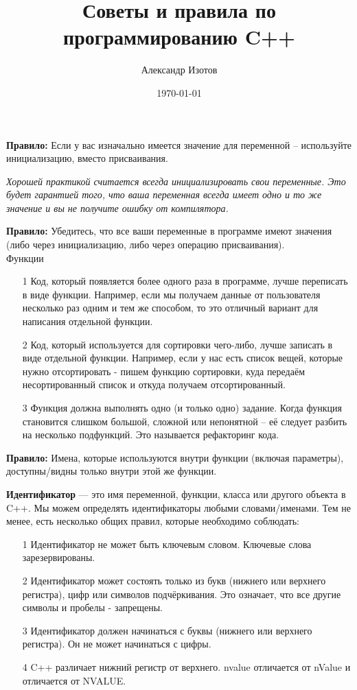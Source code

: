 \documentclass[a4paper,16pt]{report} %
\title{Советы и правила по программированию C++}
\date{\today} %
\author{Александр Изотов}
\begin{document}
\maketitle %


\textbf{Правило:} Если у вас изначально имеется значение для переменной – используйте инициализацию, вместо присваивания.

\textit{Хорошей практикой считается всегда инициализировать свои переменные. Это будет гарантией того, что ваша переменная всегда имеет одно и то же значение и вы не получите ошибку от компилятора.}

\textbf{Правило:} Убедитесь, что все ваши переменные в программе имеют значения (либо через инициализацию, либо через операцию присваивания).
\\

Функции

\begin{itemize}
	\item[1] Код, который появляется более одного раза в программе, лучше переписать в виде функции. Например, если мы получаем данные от пользователя несколько раз одним и тем же способом, то это отличный вариант для написания отдельной функции.
	\item[2] Код, который используется для сортировки чего-либо, лучше записать в виде отдельной функции. Например, если у нас есть список вещей, которые нужно отсортировать - пишем функцию сортировки, куда передаём несортированный список и откуда получаем отсортированный.
	\item[3] Функция должна выполнять одно (и только одно) задание.
	Когда функция становится слишком большой, сложной или непонятной – её следует разбить на несколько подфункций. Это называется рефакторинг кода.
\end{itemize}


\textbf{Правило:} Имена, которые используются внутри функции (включая
параметры), доступны/видны только внутри этой же функции.

\textbf{Идентификатор} — это имя переменной, функции, класса или другого объекта в C++. Мы можем определять идентификаторы любыми словами/именами. Тем не менее, есть несколько общих правил, которые необходимо соблюдать:
\begin{itemize}
\item[1]Идентификатор не может быть ключевым словом. Ключевые слова зарезервированы.
\item[2]Идентификатор может состоять только из букв (нижнего или верхнего регистра), цифр или символов подчёркивания. Это означает, что все другие символы и пробелы - запрещены.
\item[3]Идентификатор должен начинаться с буквы (нижнего или верхнего регистра). Он не может начинаться с цифры.
\item[4]C++ различает нижний регистр от верхнего. nvalue отличается от nValue и отличается от NVALUE.
\end{itemize}
\end{document}
